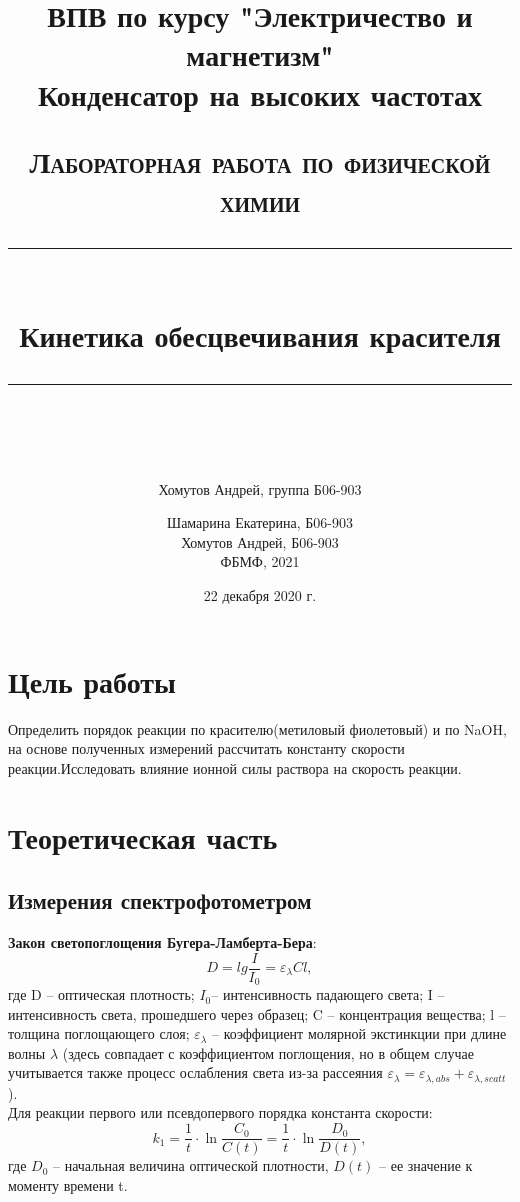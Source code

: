 \documentclass[a4paper, 12pt]{article}
\author{Хомутов Андрей, группа Б06-903}
\title{ВПВ по курсу "Электричество и магнетизм" \\ Конденсатор на высоких частотах}
\date{22 декабря 2020 г.}
\newcommand{\HRule}[1]{\rule{\linewidth}{#1}}
\begin{document}
\title{ \normalsize \textsc{Лабораторная работа по физической химии}
		\\ [4.0cm]
		\HRule{0.5pt} \\ [0.3cm]
		\LARGE \textbf{{Кинетика обесцвечивания красителя}}
		\HRule{0.5pt} \\ [0.1cm]
		\normalsize  \vspace*{18\baselineskip}}

\date{}

\author{Шамарина Екатерина, Б06-903 \\
		Хомутов Андрей, Б06-903 \\
ФБМФ, 2021\\ }

\maketitle
\thispagestyle{empty}
\newpage
\section*{Цель работы} 
Определить  порядок  реакции  по  красителю(метиловый фиолетовый)  и  по NaOH, на основе  полученных  измерений  рассчитать  константу  скорости  реакции.Исследовать влияние ионной силы раствора на скорость реакции.
 
\section{Теоретическая часть}
\subsection{Измерения спектрофотометром}
\textbf{Закон светопоглощения Бугера-Ламберта-Бера}:
\begin{equation}
D = lg\frac{I}{I_{0}} = \varepsilon_{\lambda}Cl,
\end{equation}
где D -- оптическая плотность; $I_{0}$-- интенсивность падающего света; I -- интенсивность
света, прошедшего через образец; C -- концентрация вещества; l -- толщина
поглощающего слоя; $\varepsilon_{\lambda}$ -- коэффициент молярной экстинкции при длине волны $\lambda$ (здесь совпадает с коэффициентом поглощения, но в общем случае
учитывается также процесс ослабления света из-за рассеяния $\varepsilon_{\lambda} = \varepsilon_{\lambda,abs} + \varepsilon_{\lambda,scatt}$ ).\\
Для реакции первого или псевдопервого порядка константа скорости:
\begin{equation}
k_{1} = \frac{1}{t} \cdot \ln \frac{C_{0}}{C(t)} = \frac{1}{t} \cdot \ln \frac{D_{0}}{D(t)},
\end{equation}
где $D_{0}$ -- начальная величина оптической плотности, $D(t)$ -- ее значение к моменту времени t.
\end{document}
